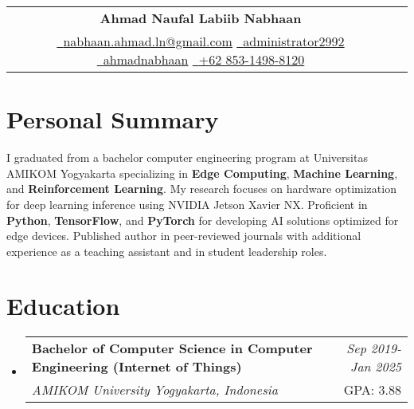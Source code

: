 \documentclass[a4paper,11pt]{article}
\makeatletter
\newcommand{\resumeSubheading}[4]{
\vspace{0.5mm}\item
    \begin{tabular*}{0.98\textwidth}[t]{l@{\extracolsep{\fill}}r}
        \textbf{#1} & \textit{\footnotesize{#4}} \\
        \textit{\footnotesize{#3}} &  \footnotesize{#2}\\
    \end{tabular*}
    \vspace{-2.4mm}
}
\newcommand{\resumeSubHeadingListStart}{\begin{itemize}[leftmargin=*,labelsep=0mm]}
\newcommand{\resumeSubHeadingListEnd}{\end{itemize}\vspace{2mm}}
\newcommand{\name}{Ahmad Naufal Labiib Nabhaan} %
\newcommand{\phone}{+62 853-1498-8120} %
\newcommand{\emaila}{nabhaan.ahmad.ln@gmail.com} %
\makeatother
\begin{document}
\selectfont

{
\begin{center}
\begin{tabularx}{\linewidth}{C r} %
  \\
  \textbf{\Huge \name} \\ %
  \href{mailto:\emaila}{\raisebox{0.0\height}{\footnotesize \faEnvelope}\ {\emaila}} \href{https://github.com/administrator2992}{\raisebox{0.0\height}{\footnotesize \faGithub}\ {administrator2992}} \href{https://linkedin.com/in/ahmadnabhaan/}{\raisebox{0.0\height}{\footnotesize \faLinkedin}\ {ahmadnabhaan}} \href{tel:\phone}{\raisebox{0.0\height}{\footnotesize \faPhone}\ {\phone}}
\end{tabularx}
\end{center}

}

\section{\textbf{Personal Summary}}
\vspace{2.5mm}
\begin{adjustwidth}{0mm}{0mm}
  \justifying  %
  \setlength{\parindent}{0pt}  %
  \setlength{\parskip}{2pt}    %
  
  I graduated from a bachelor computer engineering program at Universitas AMIKOM Yogyakarta specializing in \textbf{Edge Computing}, \textbf{Machine Learning}, and \textbf{Reinforcement Learning}. My research focuses on hardware optimization for deep learning inference using NVIDIA Jetson Xavier NX. Proficient in \textbf{Python}, \textbf{TensorFlow}, and \textbf{PyTorch} for developing AI solutions optimized for edge devices. Published author in peer-reviewed journals with additional experience as a teaching assistant and in student leadership roles.
  
  \end{adjustwidth}
\vspace{-2.5mm}

\section{\textbf{Education}}
  \resumeSubHeadingListStart
    \resumeSubheading
      {Bachelor of Computer Science in Computer Engineering (Internet of Things)}{GPA: 3.88}
      {AMIKOM University Yogyakarta, Indonesia}{Sep 2019- Jan 2025}
  \resumeSubHeadingListEnd
\vspace{-2.5mm}
%
\end{document}
